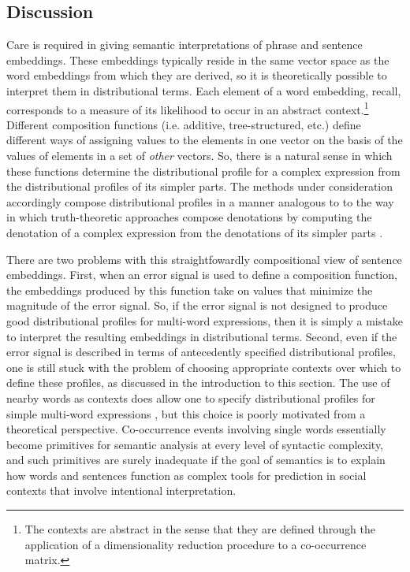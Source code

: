 \subsection{Discussion}

Care is required in giving semantic interpretations of phrase and sentence embeddings. These embeddings typically reside in the same vector space as the word embeddings from which they are derived, so it is theoretically possible to interpret them in distributional terms. Each element of a word embedding, recall, corresponds to a measure of its likelihood to occur in an abstract context.\footnote{The contexts are abstract in the sense that they are defined through the application of a dimensionality reduction procedure to a co-occurrence matrix.} Different composition functions (i.e. additive, tree-structured, etc.) define different ways of assigning values to the elements in one vector on the basis of the values of elements in a set of \textit{other} vectors. So, there is a natural sense in which these functions determine the distributional profile for a complex expression from the distributional profiles of its simpler parts. The methods under consideration accordingly compose distributional profiles in a manner analogous to to the way in which truth-theoretic approaches compose denotations by computing the denotation of a complex expression from the denotations of its simpler parts \citep{Carpenter:1997}. 

There are two problems with this straightfowardly compositional view of sentence embeddings. First, when an error signal is used to define a composition function, the embeddings produced by this function take on values that minimize the magnitude of the error signal. So, if the error signal is not designed to produce good distributional profiles for multi-word expressions, then it is simply a mistake to interpret the resulting embeddings in distributional terms. Second, even if the error signal is described in terms of antecedently specified distributional profiles, one is still stuck with the problem of choosing appropriate contexts over which to define these profiles, as discussed in the introduction to this section. The use of nearby words as contexts does allow one to specify distributional profiles for simple multi-word expressions \citep[see][pp. 290-295]{Baroni:2014}, but this choice is poorly motivated from a theoretical perspective. Co-occurrence events involving single words essentially become primitives for semantic analysis at every level of syntactic complexity, and such primitives are surely inadequate if the goal of semantics is to explain how words and sentences function as complex tools for prediction in social contexts that involve intentional interpretation. 

